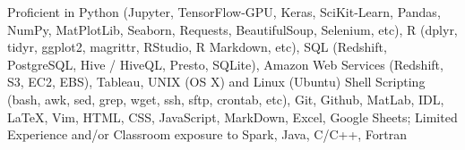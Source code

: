 Proficient in Python  
(Jupyter, TensorFlow-GPU, Keras, SciKit-Learn, Pandas, NumPy,
MatPlotLib, Seaborn, Requests,
BeautifulSoup, Selenium, etc), R (dplyr, tidyr,
ggplot2, magrittr, RStudio, R Markdown, etc), SQL (Redshift, PostgreSQL,
Hive / HiveQL, Presto, SQLite),
Amazon Web Services (Redshift, S3, EC2, EBS), Tableau, 
UNIX (OS X) and Linux (Ubuntu) Shell Scripting (bash, awk, sed,
grep, wget, ssh, sftp, crontab, etc), Git, Github, 
MatLab, IDL, LaTeX, Vim, HTML, CSS, JavaScript, MarkDown, 
Excel, Google Sheets; 
Limited Experience and/or Classroom exposure to Spark, Java, C/C++, Fortran


